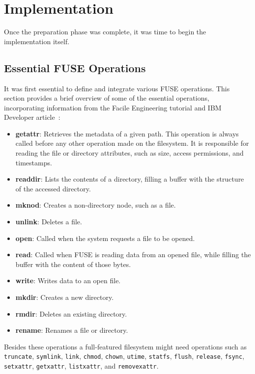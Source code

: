\chapter{Implementation}
\label{chap:implementation}

Once the preparation phase was complete, it was time to begin the implementation itself.


\section{Essential FUSE Operations}\label{sec:fuse-ops}

It was first essential to define and integrate various FUSE operations.
This section provides a brief overview of some of the essential operations, incorporating information from the Facile Engineering tutorial and IBM Developer article~\cite{ibm_fuse, facile_fuse}:

\begin{itemize}
    \item \textbf{getattr}: Retrieves the metadata of a given path.
    This operation is always called before any other operation made on the filesystem.
    It is responsible for reading the file or directory attributes, such as size, access permissions, and timestamps.
    \item \textbf{readdir}: Lists the contents of a directory, filling a buffer with the structure of the accessed directory.
    \item \textbf{mknod}: Creates a non-directory node, such as a file.
    \item \textbf{unlink}: Deletes a file.
    \item \textbf{open}: Called when the system requests a file to be opened.
    \item \textbf{read}: Called when FUSE is reading data from an opened file, while filling the buffer with the content of those bytes.
    \item \textbf{write}: Writes data to an open file.
    \item \textbf{mkdir}: Creates a new directory.
    \item \textbf{rmdir}: Deletes an existing directory.
    \item \textbf{rename}: Renames a file or directory.
\end{itemize}

Besides these operations a full-featured filesystem might need operations such as \texttt{truncate}, \texttt{symlink}, \texttt{link}, \texttt{chmod}, \texttt{chown}, \texttt{utime}, \texttt{statfs}, \texttt{flush}, \texttt{release}, \texttt{fsync}, \texttt{setxattr}, \texttt{getxattr}, \texttt{listxattr}, and \texttt{removexattr}.

